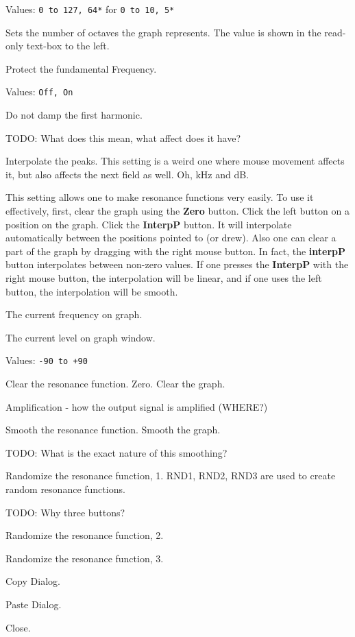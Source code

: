    Values: \texttt{0 to 127, 64*} for \texttt{0 to 10, 5*}

   Sets the number of octaves the graph represents.
   The value is shown in the read-only text-box to the left.

   Protect the fundamental Frequency.

   Values: \texttt{Off, On}

   Do not damp the first harmonic.

   TODO:  What does this mean, what affect does it have?

   Interpolate the peaks.
   This setting is a weird one where mouse movement affects it,
   but also affects the next field as well.  Oh, kHz and dB.

   This setting allows one to make resonance functions very easily.  To use
   it effectively, first, clear the graph using the \textbf{Zero} button.
   Click the left button on a position on the graph. Click the
   \textbf{InterpP} button. It will interpolate automatically between the
   positions pointed to (or drew).  Also one can clear a part of the graph
   by dragging with the right mouse button. In fact, the \textbf{interpP}
   button interpolates between non-zero values.  If one presses the
   \textbf{InterpP} with the right mouse button, the interpolation will be
   linear, and if one uses the left button, the interpolation will be
   smooth. 

   The current frequency on graph.

   The current level on graph window.

   Values: \texttt{-90 to +90}

   Clear the resonance function.
   Zero. Clear the graph.

   Amplification - how the output signal is amplified (WHERE?)

   Smooth the resonance function.
   Smooth the graph.

   TODO:  What is the exact nature of this smoothing?

   Randomize the resonance function, 1.
   RND1, RND2, RND3 are used to create random resonance functions.

   TODO:  Why three buttons?


   Randomize the resonance function, 2.

   Randomize the resonance function, 3.

   Copy Dialog.

   Paste Dialog.

   Close.

